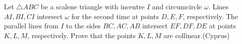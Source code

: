 Let $\triangle{ABC}$ be a scalene triangle with incentre $I$ and circumcircle $\omega$. Lines $AI, BI, CI$ intersect $\omega$ for the second time at points $D, E, F$,  respectively. The parallel lines from $I$ to the sides $BC, AC, AB$ intersect $EF, DF, DE$ at points $K, L, M$,  respectively. Prove that the points $K, L, M$ are collinear.(Cyprus)